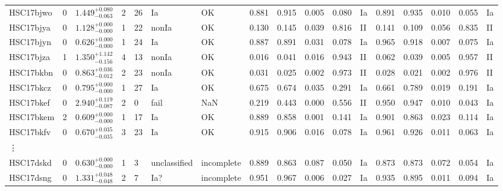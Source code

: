\documentclass[useamsfonts]{pasj01}
\begin{document}
\begin{table}[htbp]
{\begin{tabular}{p{4em}p{1em}p{4.0em}p{2.1em}|p{0.6em}p{4.0em}p{4.5em}|p{2.9em}|p{1.2em}p{1.2em}p{1.2em}p{0.6em}|p{2.9em}|p{1.2em}p{1.2em}p{1.2em}p{0.6em}}
HSC17bjwo &     0 &    $1.449_{-0.063}^{+0.080}$ &         2 &   26 &     Ia &     OK &    0.881 &    0.915 &    0.005 &    0.080 &      Ia &    0.891 &    0.935 &    0.010 &    0.055 &      Ia \\
HSC17bjya &     0 &    $1.128_{-0.000}^{+0.000}$ &         1 &   22 &  nonIa &     OK &    0.130 &    0.145 &    0.039 &    0.816 &      II &    0.141 &    0.109 &    0.056 &    0.835 &      II \\
HSC17bjyn &     0 &    $0.626_{-0.000}^{+0.000}$ &         1 &   24 &     Ia &     OK &    0.887 &    0.891 &    0.031 &    0.078 &      Ia &    0.965 &    0.918 &    0.007 &    0.075 &      Ia \\
HSC17bjza &     1 &    $1.350_{-0.156}^{+1.142}$ &         4 &   13 &  nonIa &     OK &    0.016 &    0.041 &    0.016 &    0.943 &      II &    0.062 &    0.039 &    0.005 &    0.957 &      II \\
HSC17bkbn &     0 &    $0.863_{-0.012}^{+0.036}$ &         2 &   23 &  nonIa &     OK &    0.031 &    0.025 &    0.002 &    0.973 &      II &    0.028 &    0.021 &    0.002 &    0.976 &      II \\
HSC17bkcz &     0 &    $0.795_{-0.000}^{+0.000}$ &         1 &   27 &     Ia &     OK &    0.675 &    0.674 &    0.035 &    0.291 &      Ia &    0.661 &    0.789 &    0.019 &    0.191 &      Ia \\
HSC17bkef &     0 &    $2.940_{-0.087}^{+0.119}$ &         2 &    0 &   fail &    NaN &    0.219 &    0.443 &    0.000 &    0.556 &      II &    0.950 &    0.947 &    0.010 &    0.043 &      Ia \\
HSC17bkem &     2 &    $0.609_{-0.000}^{+0.000}$ &         1 &   17 &     Ia &     OK &    0.889 &    0.858 &    0.001 &    0.141 &      Ia &    0.901 &    0.863 &    0.023 &    0.114 &      Ia \\
HSC17bkfv &     0 &    $0.670_{-0.035}^{+0.035}$ &         3 &   23 &     Ia &     OK &    0.915 &    0.906 &    0.016 &    0.078 &      Ia &    0.961 &    0.926 &    0.011 &    0.063 &      Ia \\
\vdots & & & & & & & & & & & & & & & &\\
HSC17dskd &     0 &    $0.630_{-0.000}^{+0.000}$ &         1 &    3 &  unclassified &   incomplete &    0.889 &    0.863 &    0.087 &    0.050 &      Ia &    0.873 &    0.873 &    0.072 &    0.054 &      Ia \\
HSC17dsng &     0 &    $1.331_{-0.048}^{+0.048}$ &         2 &    7 &    Ia? &   incomplete &    0.951 &    0.967 &    0.006 &    0.027 &      Ia &    0.935 &    0.895 &    0.011 &    0.094 &      Ia \\

\end{tabular}}
\end{table}
\end{document}

